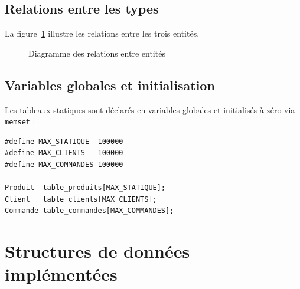 \documentclass[12pt,a4paper]{report}
\begin{document}
\section{Relations entre les types}

La figure~\ref{fig:diagramme} illustre les relations entre les trois entités.

\begin{figure}[H]
\centering
{}
\caption{Diagramme des relations entre entités}
\label{fig:diagramme}
\end{figure}

\section{Variables globales et initialisation}

Les tableaux statiques sont déclarés en variables globales et initialisés à zéro via \texttt{memset} :

\begin{lstlisting}[caption={Déclaration des tableaux globaux}]
#define MAX_STATIQUE  100000
#define MAX_CLIENTS   100000
#define MAX_COMMANDES 100000

Produit  table_produits[MAX_STATIQUE];
Client   table_clients[MAX_CLIENTS];
Commande table_commandes[MAX_COMMANDES];
\end{lstlisting}

\chapter{Structures de données implémentées}
\label{chap:structures}
\end{document}
